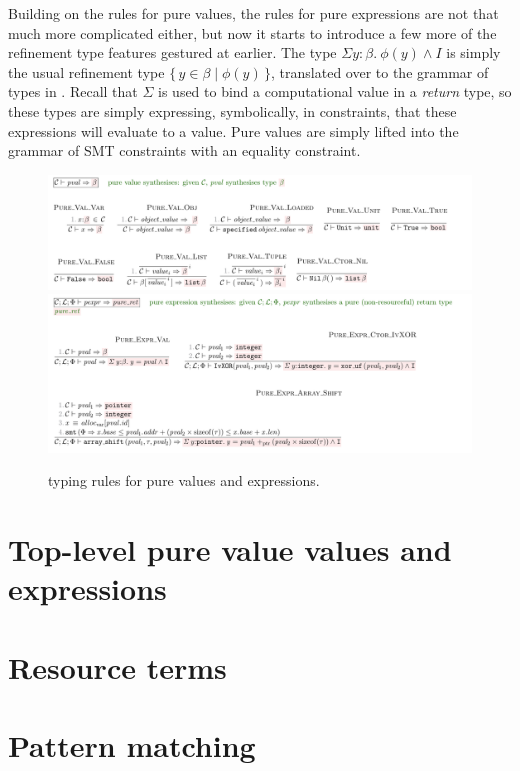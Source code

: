 Building on the rules for pure values, the rules for pure expressions are not
that much more complicated either, but now it starts to introduce a few more of
the refinement type features gestured at earlier. The type $\Sigma y {:}
\beta.\ \phi(y) \wedge{} I$ is simply the usual refinement type $\{ \, y \in \beta
 \mid\phi(y) \, \}$, translated over to the grammar of types in . Recall that $\Sigma$ is used to bind a computational value in a \emph{return} type,
so these types are simply expressing, symbolically, in constraints, that these
expressions will evaluate to a value. Pure values are simply lifted into the
grammar of SMT constraints with an equality constraint.

\begin{figure}
    \includegraphics{figures/kernel-pval-typing}
    \includegraphics{figures/kernel-pexpr-typing}
    \caption{ typing rules for pure values and expressions.}\label{fig:typing-pval-pexpr}
\end{figure}

\section{Top-level pure value values and expressions}


\section{Resource terms}\label{sec:typing-res-terms}

\section{Pattern matching}


